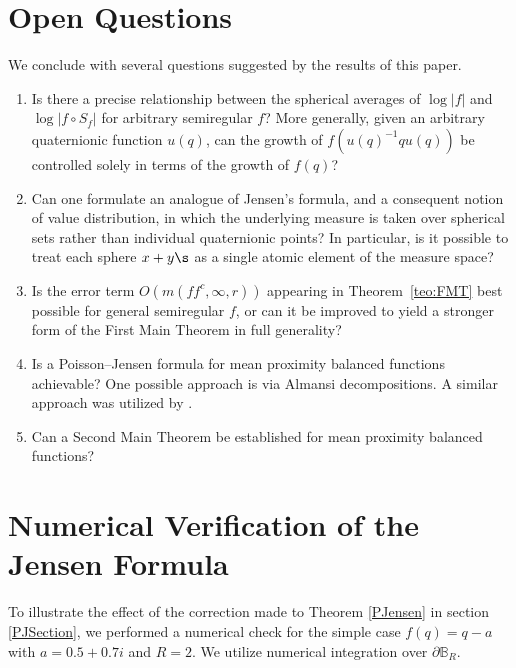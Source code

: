 \documentclass{amsart}
\begin{document}
\section{Open Questions}\label{sec:OpenQuestions}

We conclude with several questions suggested by the results of this paper. 

\begin{enumerate}
    \item Is there a precise relationship between the spherical averages of $\log|f|$ and $\log|f\circ S_f|$ for arbitrary semiregular $f$? More generally, given an arbitrary quaternionic function $u(q)$, can the growth of $f(u(q)^{-1}qu(q))$ be controlled solely in terms of the growth of $f(q)$?

    \item Can one formulate an analogue of Jensen's formula, and a consequent notion of value distribution, in which the underlying measure is taken over spherical sets rather than individual quaternionic points? In particular, is it possible to treat each sphere $x+y\s$ as a single atomic element of the measure space?

    \item Is the error term $O(m(ff^c,\infty,r))$ appearing in Theorem~\ref{teo:FMT} best possible for general semiregular $f$, or can it be improved to yield a stronger form of the First Main Theorem in full generality?

    \item Is a Poisson--Jensen formula for mean proximity balanced functions achievable? One possible approach is via Almansi decompositions. A similar approach was utilized by \cite{Perotti2020}. 

    \item Can a Second Main Theorem be established for mean proximity balanced functions?
\end{enumerate}






\appendix
\section{Numerical Verification of the Jensen Formula}

To illustrate the effect of the correction made to Theorem \ref{PJensen} in section \ref{PJSection}, we performed a numerical check for the simple case $f(q)=q-a$ with $a=0.5+0.7i$ and $R=2$. We utilize numerical integration over $\partial \mathbb B_R$. 
\end{document}
